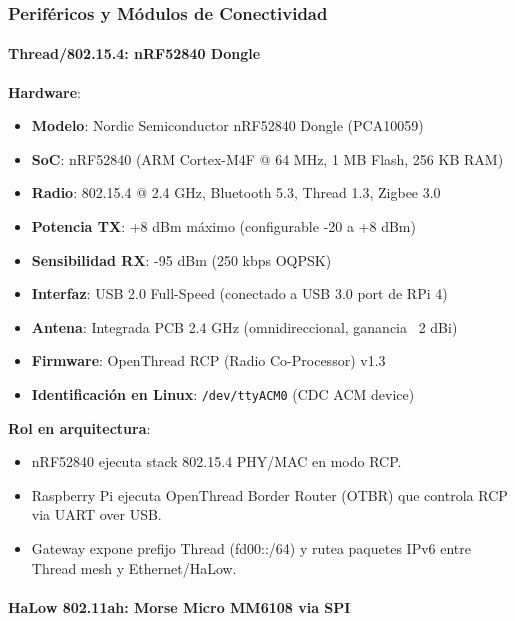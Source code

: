 \subsubsection{Periféricos y Módulos de Conectividad}

\paragraph{Thread/802.15.4: nRF52840 Dongle}

\textbf{Hardware}:
\begin{itemize}
    \item \textbf{Modelo}: Nordic Semiconductor nRF52840 Dongle (PCA10059)
    \item \textbf{SoC}: nRF52840 (ARM Cortex-M4F @ 64 MHz, 1 MB Flash, 256 KB RAM)
    \item \textbf{Radio}: 802.15.4 @ 2.4 GHz, Bluetooth 5.3, Thread 1.3, Zigbee 3.0
    \item \textbf{Potencia TX}: +8 dBm máximo (configurable -20 a +8 dBm)
    \item \textbf{Sensibilidad RX}: -95 dBm (250 kbps OQPSK)
    \item \textbf{Interfaz}: USB 2.0 Full-Speed (conectado a USB 3.0 port de RPi 4)
    \item \textbf{Antena}: Integrada PCB 2.4 GHz (omnidireccional, ganancia ~2 dBi)
    \item \textbf{Firmware}: OpenThread RCP (Radio Co-Processor) v1.3
    \item \textbf{Identificación en Linux}: \texttt{/dev/ttyACM0} (CDC ACM device)
\end{itemize}

\textbf{Rol en arquitectura}:
\begin{itemize}
    \item nRF52840 ejecuta stack 802.15.4 PHY/MAC en modo RCP.
    \item Raspberry Pi ejecuta OpenThread Border Router (OTBR) que controla RCP via UART over USB.
    \item Gateway expone prefijo Thread (fd00::/64) y rutea paquetes IPv6 entre Thread mesh y Ethernet/HaLow.
\end{itemize}

\paragraph{HaLow 802.11ah: Morse Micro MM6108 via SPI}

